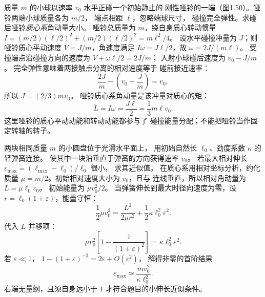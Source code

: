 质量 $m$ 的小球以速率 $v_0$ 水平正碰一个初始静止的
刚性哑铃的一端（图1.50）。哑铃两端小球质量各为 $m/2$，
端点相距 $\ell$，忽略端球尺寸，
碰撞完全弹性。求碰后哑铃\emph{质心系}角动量大小。
\exsolution
哑铃总质量为 $m$，绕自身质心转动惯量
$I=(m/2)(\ell/2)^2+(m/2)(\ell/2)^2=m\ell^2/4$。
设水平碰撞冲量为 $J$；则哑铃质心平动速度
$V=J/m$，角速度满足
$I\omega=J\ell/2$，故
$\omega=2J/(m\ell)$。
受撞端点沿碰撞方向的速度为
$V+\omega\ell/2=2J/m$；
入射小球碰后速度为 $v_0-J/m$。
完全弹性意味着两接触点分离的相对速度等于
碰前接近速率：
\[
\frac{2J}{m}-\left(v_0-\frac Jm\right)=v_0,
\]
所以 $J=(2/3)mv_0$。
哑铃质心系角动量是该冲量对质心的矩：
\[
\boxed{\widetilde L=I\omega=\frac{J\ell}{2}
=\frac13m\ell v_0}.
\]
\excheck 这里哑铃的质心平动动能和转动动能都参与了
碰撞能量分配；不能把哑铃当作固定转轴的转子。

两块相同质量 $m$ 的小圆盘位于光滑水平面上，
用初始自然长 $\ell_0$、劲度系数 $\kappa$ 的轻弹簧连接。
使其中一块沿垂直于弹簧的方向获得速率 $v_0$。
若最大相对伸长 $\varepsilon_{\max}=
(\ell_{\max}-\ell_0)/\ell_0$ 很小，
求其近似值。
\exsolution
在质心系用相对坐标分析，约化质量
$\mu=m/2$。初始相对速度大小为 $v_0$，且与
连线垂直，所以相对角动量为
$L=\mu\ell_0v_0$。
初始能量为 $\mu v_0^2/2$。
当弹簧伸长到最大时径向速度为零，设
$r=\ell_0(1+\varepsilon)$，能量守恒：
\[
\frac12\mu v_0^2
=\frac{L^2}{2\mu r^2}
+\frac12\kappa\ell_0^2\varepsilon^2.
\]
代入 $L$ 并移项：
\[
\mu v_0^2\left[1-\frac1{(1+\varepsilon)^2}\right]
=\kappa\ell_0^2\varepsilon^2.
\]
若 $\varepsilon\ll1$，
$1-(1+\varepsilon)^{-2}=2\varepsilon+O(\varepsilon^2)$，
解得非零的首阶结果
\[
\boxed{\varepsilon_{\max}\simeq
\frac{m v_0^2}{\kappa\ell_0^2}}.
\]
\excheck 右端无量纲，且须自身远小于 $1$
才符合题目的小伸长近似条件。
